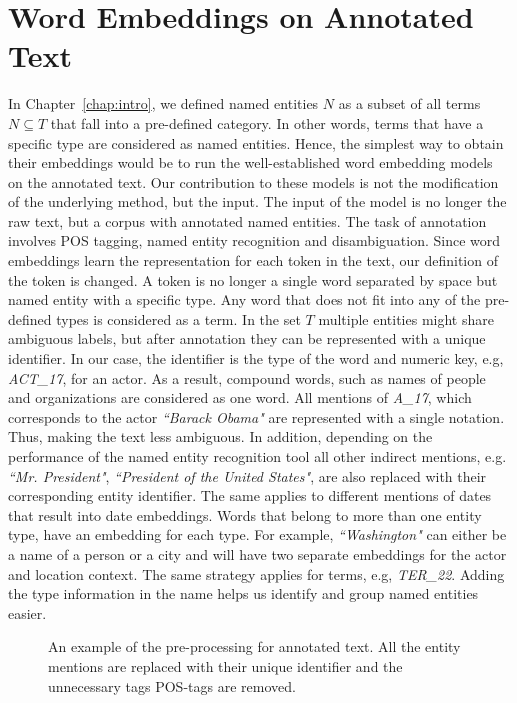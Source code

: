 \section{Word Embeddings on Annotated Text}\label{sec:annotated}
In Chapter~\ref{chap:intro}, we defined named entities $N$ as a subset of all terms $N\subseteq T$ that fall into a pre-defined category. In other words, terms that have a specific type are considered as named entities. Hence, the simplest way to obtain their embeddings would be to run the well-established word embedding models on the annotated text. Our contribution to these models is not the modification of the underlying method, but the input. The input of the model is no longer the raw text, but a corpus with annotated named entities. The task of annotation involves POS tagging, named entity recognition and disambiguation. Since word embeddings learn the representation for each token in the text, our definition of the token is changed. A token is no longer a single word separated by space but named entity with a specific type. Any word that does not fit into any of the pre-defined types is considered as a term. In the set $T$ multiple entities might share ambiguous labels, but after annotation they can be represented with a unique identifier. In our case, the identifier is the type of the word and numeric key, e.g,  \emph{ACT\_17}, for an actor. As a result, compound words, such as names of people and organizations are considered as one word. All mentions of  \emph{A\_17}, which corresponds to the actor  \emph{``Barack Obama"} are represented with a single notation. Thus, making the text less ambiguous. In addition, depending on the performance of the named entity recognition tool all other indirect mentions, e.g. \emph{``Mr. President"}, \emph{``President of the United States"}, are also replaced with their corresponding entity identifier. The same applies to different mentions of dates that result into date embeddings. Words that belong to more than one entity type, have an embedding for each type. For example, \emph{``Washington"} can either be a name of a person or a city and will have two separate embeddings for the actor and location context. The same strategy applies for terms, e.g,  \emph{TER\_22}.  Adding the type information in the name helps us identify and group named entities easier. \\
\begin{figure}
\centering 
\resizebox{0.85\textwidth}{0.28\textwidth}{      

}
\caption{An example of the pre-processing for annotated text. All the entity mentions are replaced with their unique identifier and the unnecessary tags POS-tags are removed. }
\label{fig:annotation}
\end{figure}
